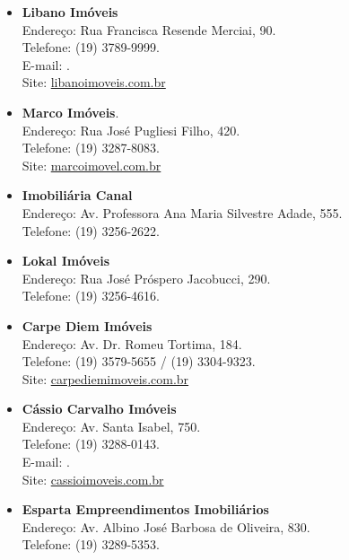 \begin{itemize}
\item   \textbf{Libano Imóveis}
		\\Endereço: Rua Francisca Resende Merciai, 90.
		\\Telefone: (19) 3789-9999.
		\\E-mail: .
		\\Site: \url{libanoimoveis.com.br}

\item   \textbf{Marco Imóveis}.
		\\Endereço: Rua José Pugliesi Filho, 420.
		\\Telefone: (19) 3287-8083.
		\\Site: \url{marcoimovel.com.br}

\item   \textbf{Imobiliária Canal}
		\\Endereço: Av. Professora Ana Maria Silvestre Adade, 555.
		\\Telefone: (19) 3256-2622.

\item   \textbf{Lokal Imóveis}
		\\Endereço: Rua José Próspero Jacobucci, 290.
		\\Telefone: (19) 3256-4616.

\item   \textbf{Carpe Diem Imóveis}
		\\Endereço: Av. Dr. Romeu Tortima, 184.
		\\Telefone: (19) 3579-5655 / (19) 3304-9323.
		\\Site: \url{carpediemimoveis.com.br}

\item   \textbf{Cássio Carvalho Imóveis}
		\\Endereço: Av. Santa Isabel, 750.
		\\Telefone: (19) 3288-0143.
		\\E-mail: .
		\\Site: \url{cassioimoveis.com.br}


\item   \textbf{Esparta Empreendimentos Imobiliários}
        \\Endereço: Av. Albino José Barbosa de Oliveira, 830.
        \\Telefone: (19) 3289-5353.


\end{itemize}
